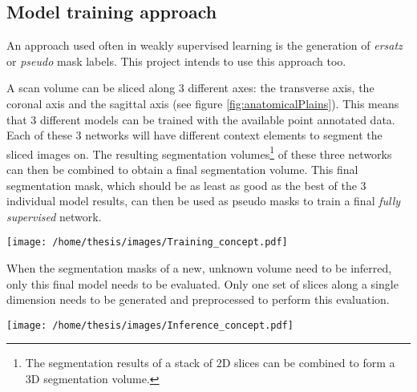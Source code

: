 \subsection{Model training approach}

An approach used often in weakly supervised learning is the generation of \textit{ersatz} or \textit{pseudo} mask labels.
This project intends to use this approach too.

A scan volume can be sliced along 3 different axes: the transverse axis, the coronal axis and the sagittal axis (see figure \ref{fig:anatomicalPlains}). 
This means that 3 different models can be trained with the available point annotated data. 
Each of these 3 networks will have different context elements to segment the sliced images on.
The resulting segmentation volumes\footnote{The segmentation results of a stack of 2D slices can be combined to form a 3D segmentation volume.} of these three networks can then be combined to obtain a final segmentation volume.
This final segmentation mask, which should be as least as good as the best of the 3 individual model results, can then be used as pseudo masks to train a final \textit{fully supervised} network. 

\begin{SCfigure}[][htb]
    \centering
    \texttt{[image: /home/thesis/images/Training\_concept.pdf]}
    \caption{\label{fig:model_training_concept}Illustration of the model training approach. 
    This is based on the conbination of 3 different models based on different volume slices.}
\end{SCfigure}

When the segmentation masks of a new, unknown volume need to be inferred, only this final model needs to be evaluated.
Only one set of slices along a single dimension needs to be generated and preprocessed to perform this evaluation.

\begin{SCfigure}[][htb]
    \centering
    \texttt{[image: /home/thesis/images/Inference\_concept.pdf]}
    \caption{Inference step. Only one model needs to be evaluated in this step, the model that is trianed in the final step of the training procedure illustrated in figure \ref{fig:model_training_concept}.}
\end{SCfigure}